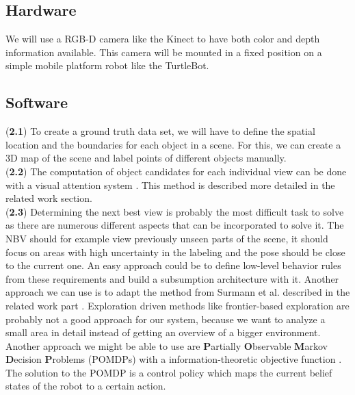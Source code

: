 \documentclass[a4paper,11pt,english]{article}
\begin{document}
\subsection{Hardware}
We will use a RGB-D camera like the Kinect to have both color and depth information available.
This camera will be mounted in a fixed position on a simple mobile platform robot like the TurtleBot.

\subsection{Software}
(\textbf{2.1}) To create a ground truth data set, we will have to define the spatial location and the boundaries for each object in a scene.
For this, we can create a 3D map of the scene and label points of different objects manually.\\
(\textbf{2.2}) The computation of object candidates for each individual view can be done with a visual attention system \cite{garcia2013computational}.
This method is described more detailed in the related work section.\\
(\textbf{2.3}) Determining the next best view is probably the most difficult task to solve as there are numerous different aspects that can be incorporated to solve it.
The NBV should for example view previously unseen parts of the scene, it should focus on areas with high uncertainty in the labeling and the pose should be close to the current one.
An easy approach could be to define low-level behavior rules from these requirements and build a subsumption architecture \cite{brooks1986robust} with it.
Another approach we can use is to adapt the method from Surmann et al. described in the related work part \cite{surmann2003autonomous}.
Exploration driven methods like frontier-based exploration are probably not a good approach for our system, because we want to analyze a small area in detail instead of getting an overview of a bigger environment.
Another approach we might be able to use are \textbf{P}artially \textbf{O}bservable \textbf{M}arkov \textbf{D}ecision \textbf{P}roblems (POMDPs) with a information-theoretic objective function \cite{lauri2015planning}.
The solution to the POMDP is a control policy which maps the current belief states of the robot to a certain action. 
\end{document}
